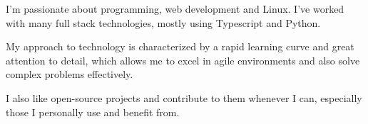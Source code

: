 

\begin{cvparagraph}

I'm passionate about programming, web development
and Linux.
I've worked with many full stack technologies, mostly using
Typescript and Python.
\end{cvparagraph}

\begin{cvparagraph}
My approach to technology is characterized by a rapid learning curve and great attention to detail, which allows me to excel in agile environments and also solve complex problems effectively.
\end{cvparagraph}

\begin{cvparagraph}

I also like open-source projects and contribute to them whenever I can, especially those I personally use and benefit from.


\end{cvparagraph}